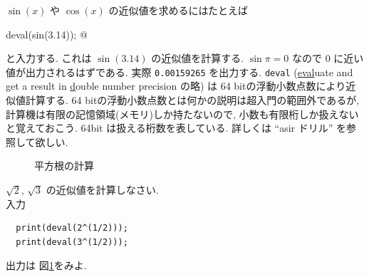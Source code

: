 \documentclass{jbook}
\begin{document}
$\sin(x)$ や $\cos(x)$ の近似値を求めるにはたとえば
\begin{center}
\verb@  deval(sin(3.14));  @ 
\end{center}
と入力する.   
これは $\sin (3.14)$ の近似値を計算する.
$\sin \pi = 0 $ なので $0$ に近い値が出力されるはずである.
実際 {\tt 0.00159265} を出力する.  
{\tt deval}  
(\underline{eval}uate and get a result in {\underline d}ouble number precision の略)
は 64 bitの浮動小数点数により近似値計算する. 
64 bitの浮動小数点数とは何かの説明は超入門の範囲外であるが,
計算機は有限の記憶領域(メモリ)しか持たないので, 小数も有限桁しか扱えない
と覚えておこう. 64bit は扱える桁数を表している.
詳しくは ``asir ドリル'' を参照して欲しい.


\begin{figure}[thb]
\begin{center}
\end{center}
\caption{平方根の計算}
\label{fig:sqrt2}
\end{figure}

\begin{example} \rm
$\sqrt{2}$, $\sqrt{3}$ の近似値を計算しなさい. \\
入力
\begin{screen}
\begin{verbatim}
  print(deval(2^(1/2)));
  print(deval(3^(1/2)));
\end{verbatim}
\end{screen}
出力は
図\ref{fig:sqrt2}をみよ.
\end{example}
\end{document}
